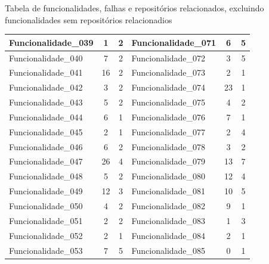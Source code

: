 \documentclass[11.5pt]{article}
\begin{document}
\begin{apendice}{Tabela de funcionalidades, falhas e repositórios relacionados, excluindo funcionalidades sem repositórios relacionadios}
\begin{table}[ht]
\begin{tabular}{|l|c|c||l|c|c|}
Funcionalidade\_039 & 1 & 2     & Funcionalidade\_071 & 6 & 5 \\ \hline
Funcionalidade\_040 & 7 & 2     & Funcionalidade\_072 & 3 & 5 \\ \hline
Funcionalidade\_041 & 16 & 2    & Funcionalidade\_073 & 2 & 1 \\ \hline
Funcionalidade\_042 & 3 & 2     & Funcionalidade\_074 & 23 & 1 \\ \hline
Funcionalidade\_043 & 5 & 2     & Funcionalidade\_075 & 4 & 2 \\ \hline
Funcionalidade\_044 & 6 & 1     & Funcionalidade\_076 & 7 & 1 \\ \hline
Funcionalidade\_045 & 2 & 1     & Funcionalidade\_077 & 2 & 4 \\ \hline
Funcionalidade\_046 & 6 & 2     & Funcionalidade\_078 & 3 & 2 \\ \hline
Funcionalidade\_047 & 26 & 4    & Funcionalidade\_079 & 13 & 7 \\ \hline
Funcionalidade\_048 & 5 & 2     & Funcionalidade\_080 & 12 & 4 \\ \hline
Funcionalidade\_049 & 12 & 3    & Funcionalidade\_081 & 10 & 5 \\ \hline
Funcionalidade\_050 & 4 & 2     & Funcionalidade\_082 & 9 & 1 \\ \hline
Funcionalidade\_051 & 2 & 2     & Funcionalidade\_083 & 1 & 3 \\ \hline
Funcionalidade\_052 & 2 & 1     & Funcionalidade\_084 & 2 & 1 \\ \hline
Funcionalidade\_053 & 7 & 5     & Funcionalidade\_085 & 0 & 1 \\ \hline
\end{tabular}
\end{table}


\end{apendice}
\end{document}
